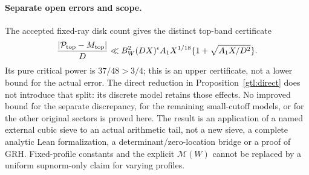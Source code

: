 \paragraph{Separate open errors and scope.}\label{gtl:boundary}
The accepted fixed-ray disk count gives the distinct top-band
certificate
\begin{equation}\label{gtl:ray-error}
 \frac{|\mathcal P_{\rm top}-M_{\rm top}|}{D}
 \ll B_W^2(DX)^\epsilon A_1X^{1/18}
                       \{1+\sqrt{A_1X/D^2}\}.
\end{equation}
Its pure critical power is $37/48>3/4$; this is an upper certificate,
not a lower bound for the actual error. The direct reduction in Proposition~\ref{gtl:direct} does not
introduce that split: its discrete model retains those effects.
No improved bound for the separate discrepancy, for the remaining
small-cutoff models, or for the other original sectors is proved here. The result is an application of a named external
cubic sieve to an actual arithmetic tail, not a new sieve, a complete
analytic Lean formalization, a determinant/zero-location bridge or
a proof of GRH. Fixed-profile constants and the explicit
$\mathcal M(W)$ cannot be replaced by a uniform supnorm-only claim
for varying profiles.
